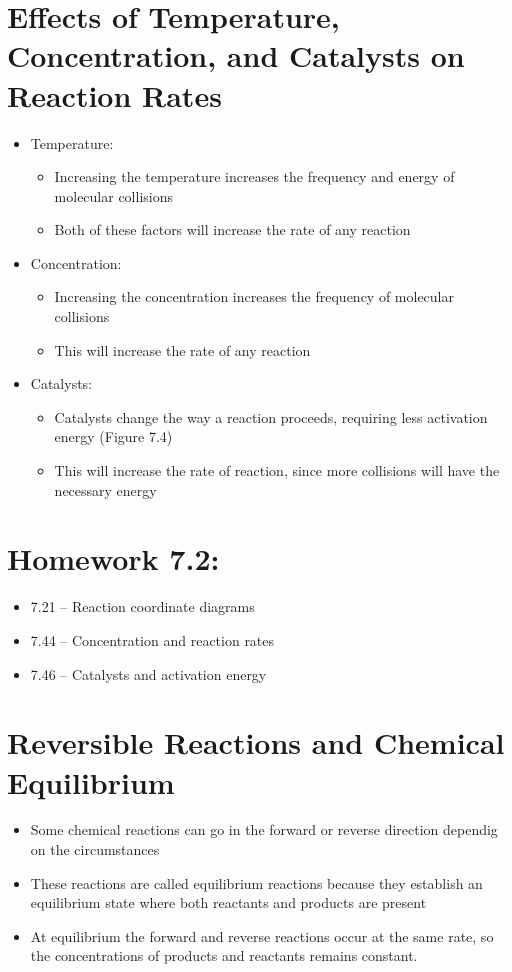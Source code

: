 \documentclass[12pt, openany, letterpaper]{memoir}
\begin{document}
\section{Effects of Temperature, Concentration, and Catalysts on Reaction Rates}
\begin{itemize}
	\item Temperature:
	      \begin{itemize}
		      \item Increasing the temperature increases the frequency and energy of molecular collisions
		      \item Both of these factors will increase the rate of any reaction
	      \end{itemize}
	\item Concentration:
	      \begin{itemize}
		      \item Increasing the concentration increases the frequency of molecular collisions
		      \item This will increase the rate of any reaction
	      \end{itemize}
	\item Catalysts:
	      \begin{itemize}
		      \item Catalysts change the way a reaction proceeds, requiring less activation energy (Figure 7.4)
		      \item This will increase the rate of reaction, since more collisions will have the necessary energy
	      \end{itemize}
\end{itemize}

\section*{Homework 7.2:}
\begin{itemize}
  \item 7.21 -- Reaction coordinate diagrams
  \item 7.44 -- Concentration and reaction rates
  \item 7.46 -- Catalysts and activation energy
\end{itemize}

\section{Reversible Reactions and Chemical Equilibrium}
\begin{itemize}
	\item Some chemical reactions can go in the forward or reverse direction dependig on the circumstances
	\item These reactions are called equilibrium reactions because they establish an equilibrium state where both reactants and products are present
	\item At equilibrium the forward and reverse reactions occur at the same rate, so the concentrations of products and reactants remains constant.
\end{itemize}
\end{document}
